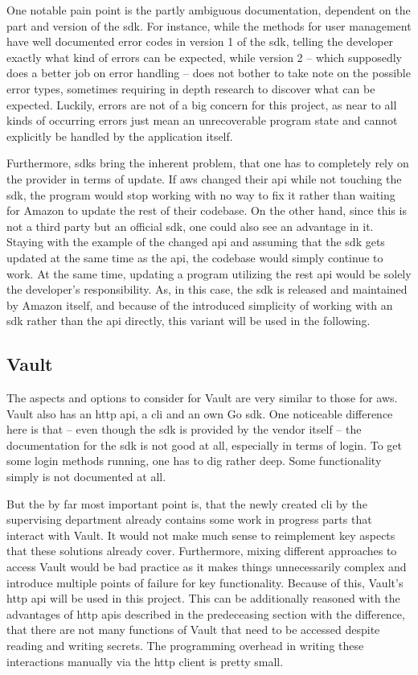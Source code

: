 One notable pain point is the partly ambiguous documentation, dependent on the part and version of the \ac{sdk}.
For instance, while the methods for user management have well documented error codes in version 1 of the \ac{sdk}, telling the developer exactly what kind of errors can be expected, while version 2 -- which supposedly does a better job on error handling -- does not bother to take note on the possible error types, sometimes requiring in depth research to discover what can be expected.
Luckily, errors are not of a big concern for this project, as near to all kinds of occurring errors just mean an unrecoverable program state and cannot explicitly be handled by the application itself.

Furthermore, \acp{sdk} bring the inherent problem, that one has to completely rely on the provider in terms of update.
If \ac{aws} changed their \ac{api} while not touching the \ac{sdk}, the program would stop working with no way to fix it rather than waiting for Amazon to update the rest of their codebase.
On the other hand, since this is not a third party but an official \ac{sdk}, one could also see an advantage in it.
Staying with the example of the changed \ac{api} and assuming that the \ac{sdk} gets updated at the same time as the \ac{api}, the codebase would simply continue to work.
At the same time, updating a program utilizing the \acs{rest} \ac{api} would be solely the developer's responsibility.
As, in this case, the \ac{sdk} is released and maintained by Amazon itself, and because of the introduced simplicity of working with an \ac{sdk} rather than the \ac{api} directly, this variant will be used in the following.

\subsection{Vault}
The aspects and options to consider for Vault are very similar to those for \ac{aws}.
Vault also has an \ac{http} \ac{api}, a \ac{cli} and an own Go \ac{sdk}.
One noticeable difference here is that -- even though the \ac{sdk} is provided by the vendor itself -- the documentation for the \ac{sdk} is not good at all, especially in terms of login.
To get some login methods running, one has to dig rather deep.
Some functionality simply is not documented at all.


But the by far most important point is, that the newly created \ac{cli} by the supervising department already contains some work in progress parts that interact with Vault.
It would not make much sense to reimplement key aspects that these solutions already cover.
Furthermore, mixing different approaches to access Vault would be bad practice as it makes things unnecessarily complex and introduce multiple points of failure for key functionality.
Because of this, Vault's \ac{http} \ac{api} will be used in this project.
This can be additionally reasoned with the advantages of \ac{http} \acp{api} described in the predeceasing section with the difference, that there are not many functions of Vault that need to be accessed despite reading and writing secrets.
The programming overhead in writing these interactions manually via the \ac{http} client is pretty small.

